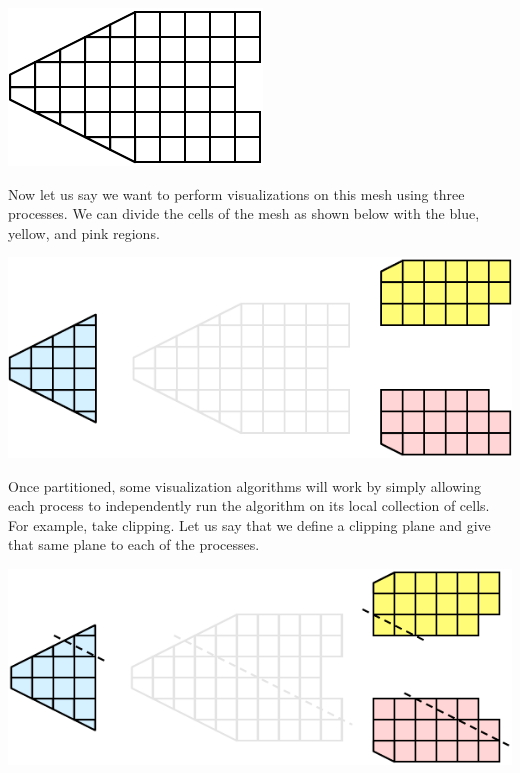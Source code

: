 \begin{inlinefig}
  \includegraphics[scale=\bbscale]{images/ParallelExampleMesh}
\end{inlinefig}

Now let us say we want to perform visualizations on this mesh using three
processes.  We can divide the cells of the mesh as shown below with the
blue, yellow, and pink regions.

\begin{inlinefig}
  \includegraphics[scale=\bbscale]{images/ParallelExamplePartitions}
\end{inlinefig}

Once partitioned, some visualization algorithms will work by simply
allowing each process to independently run the algorithm on its local
collection of cells.  For example, take clipping.  Let us say that we
define a clipping plane and give that same plane to each of the processes.

\begin{inlinefig}
  \includegraphics[scale=\bbscale]{images/ParallelExampleClip1}
\end{inlinefig}

